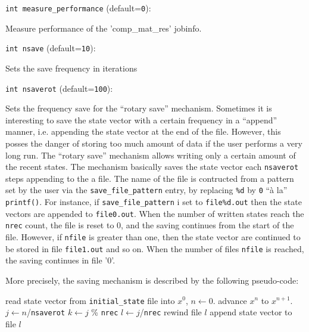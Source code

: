 \item\verb+int measure_performance+ {\rm(default=\verb|0|)}:

Measure performance of the 'comp\_mat\_res' jobinfo. 

\item\verb+int nsave+ {\rm(default=\verb|10|)}:

Sets the save frequency in iterations 

\item\verb+int nsaverot+ {\rm(default=\verb|100|)}:

Sets the frequency save for the ``rotary save'' mechanism. 
\label{sec:rotary_save}
Sometimes it is interesting to save the state vector with a certain
frequency in a ``append'' manner, i.e. appending the state vector at
the end of the file. However, this posses the danger of storing too
much amount of data if the user performs a very long run. The ``rotary
save'' mechanism allows writing only a certain amount of the recent
states. The mechanism basically saves the state vector each
\verb+nsaverot+ steps appending to the a file. The name of the file is
contructed from a pattern set by the user via the
\verb+save_file_pattern+ entry, by replacing \verb+%d+ 
by \verb+0+ ``\`a la'' \verb+printf()+. For instance, if
\verb+save_file_pattern+ i set to \verb+file%d.out+ 
then the state vectors are appended to \verb+file0.out+.  When the
number of written states reach the \verb+nrec+ count, the file is
reset to 0, and the saving continues from the start of the
file. However, if \verb+nfile+ is greater than one, then the state
vector are continued to be stored in file \verb+file1.out+ and so
on. When the number of files \verb+nfile+ is reached, the saving
continues in file '0'.

More precisely, the saving mechanism is described by the following
pseudo-code:

\begin{algorithmic}
\STATE read state vector from \verb+initial_state+ file into $x^0$, $n\gets 0$.
  \STATE advance $x^n$ to $x^{n+1}$.
    \STATE $j \gets n$/{\tt nsaverot}
    \STATE $k \gets j$ \% {\tt nrec}
    \STATE $l \gets j$/{\tt nrec}
    \STATE rewind file $l$ \ENDIF
    \STATE append state vector to file $l$
  \ENDIF
\ENDFOR
\end{algorithmic}

